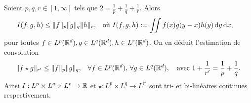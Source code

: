 \begin{theorem}
\label{th:Young}
%
	Soient $p,q,r \in [1,\infty]$ tels que $2 = \frac 1 p + \frac 1 q +\frac 1 r$. 
	Alors 
	\begin{align*}
		I(f,g,h) &\leq \|f\|_p \|g\|_q \|h\|_r, &
		\text{où }
		I(f,g,h) &:= \iint f(x) g(y-x) h(y) \, \mathrm{d} y \, \mathrm{d} x,
	\end{align*}
	pour toutes $f \in L^p(\mathbb{R}^d), g \in L^q(\mathbb{R}^d), h \in L^r(\mathbb{R}^d)$. On en déduit l'estimation de convolution
	\begin{align*}
		\|f\star g\|_{r'} &\leq \|f\|_p \|g\|_q, &
		\forall f \in L^p(\mathbb{R}^d),\, \forall g \in L^q(\mathbb{R}^d),
		\quad \text{avec }
		1+\frac 1 {r'} = \frac 1 p + \frac 1 q.
	\end{align*}
	Ainsi $I : L^p \times L^q \times L^r\to \mathbb{R}$ et $\star : L^p\times L^q \to L^{r'}$ sont tri- et bi-linéaires continues respectivement. 
\end{theorem}


